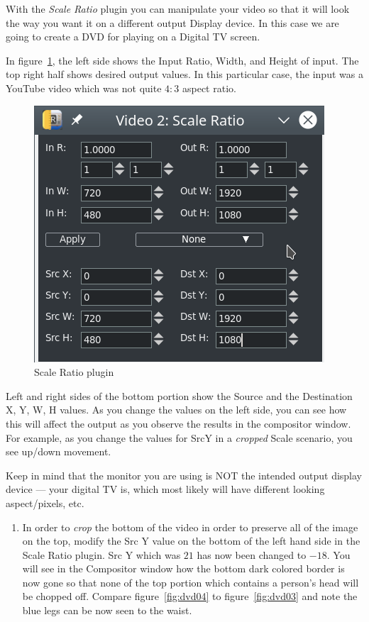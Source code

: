 With the \textit{Scale Ratio} plugin you can manipulate your video so that it will look the way you want it on a different output Display device.  In this case we are going to create a DVD for playing on a Digital TV screen. 

In figure~\ref{fig:scaleratio}, the left side shows the Input Ratio, Width, and Height of input. The top right half shows desired output values.  In this particular case, the input was a YouTube video which was not quite $4:3$ aspect ratio.

\begin{figure}[htpb]
    \centering
    \includegraphics[width=0.7\linewidth]{images/scaleratio.png}
    \caption{Scale Ratio plugin}
    \label{fig:scaleratio}
\end{figure}

Left and right sides of the bottom portion show the Source and the Destination X, Y, W, H values.  As you change the values on the left side, you can see how this will affect the output as you observe the results in the compositor window.  For example, as you change the values for SrcY in a \textit{cropped} Scale scenario, you see up/down movement.

Keep in mind that the monitor you are using is NOT the intended output display device --- your digital TV is, which most likely will have different looking aspect/pixels, etc.

\begin{enumerate}[start=11]
    \item In order to \textit{crop} the bottom of the video in order to preserve all of the image on the top, modify the Src Y value on the bottom of  the left hand side in the Scale Ratio plugin.  Src Y which was $21$ has now been changed to $-18$.  You will see in the Compositor window how the bottom dark colored border is now gone so that none of the top portion which contains a person's head will be chopped off. Compare figure~\ref{fig:dvd04} to figure~\ref{fig:dvd03} and note the blue legs can be now seen to the waist.
\end{enumerate}

